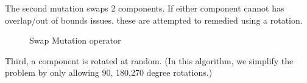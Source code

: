 \documentclass{article}
\begin{document}
The second mutation swaps 2 components. If either component cannot has overlap/out of bounds issues. these are attempted to remedied using a rotation. 
\begin{figure}[ht]
\centering
{}
\caption{Swap Mutation operator}
\end{figure}

Third, a component is rotated at random. (In this algorithm, we simplify the problem by only allowing 90, 180,270 degree rotations.)
\end{document}
